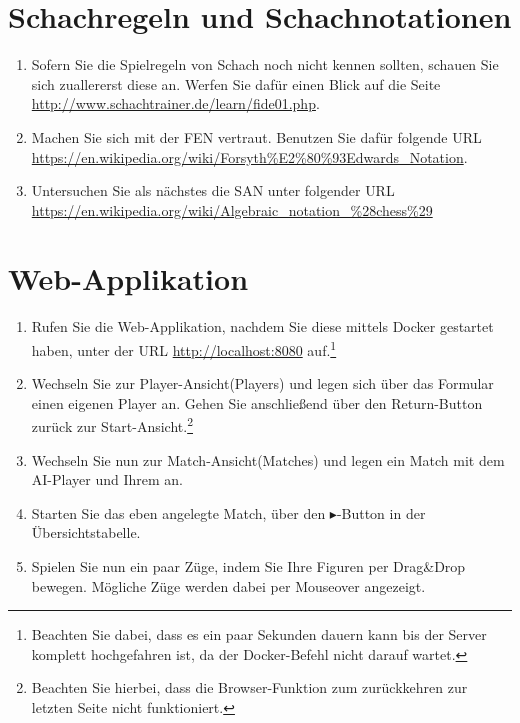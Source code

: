 \section{Schachregeln und Schachnotationen}
\begin{enumerate}
	\item Sofern Sie die Spielregeln von Schach noch nicht kennen sollten, schauen Sie sich zuallererst diese an. Werfen Sie dafür einen Blick auf die Seite \url{http://www.schachtrainer.de/learn/fide01.php}.
	\item Machen Sie sich mit der \acrfull{FEN} vertraut. Benutzen Sie dafür folgende \gls{URL} \url{https://en.wikipedia.org/wiki/Forsyth\%E2\%80\%93Edwards_Notation}.
	\item Untersuchen Sie als nächstes die \acrfull{SAN} unter folgender \gls{URL} \url{https://en.wikipedia.org/wiki/Algebraic_notation_\%28chess\%29}
\end{enumerate}

\section{Web-Applikation}
\begin{enumerate}
	\item Rufen Sie die Web-Applikation, nachdem Sie diese mittels Docker gestartet haben, unter der \gls{URL} \url{http://localhost:8080} auf.\footnote{Beachten Sie dabei, dass es ein paar Sekunden dauern kann bis der Server komplett hochgefahren ist, da der Docker-Befehl nicht darauf wartet.}
	\item Wechseln Sie zur Player-Ansicht(Players) und legen sich über das Formular einen eigenen Player an. Gehen Sie anschließend über den Return-Button zurück zur Start-Ansicht.\footnote{Beachten Sie hierbei, dass die Browser-Funktion zum zurückkehren zur letzten Seite nicht funktioniert.}
	\item Wechseln Sie nun zur Match-Ansicht(Matches) und legen ein Match mit dem AI-Player und Ihrem an.
	\item Starten Sie das eben angelegte Match, über den $\blacktriangleright$-Button in der Übersichtstabelle.
	\item Spielen Sie nun ein paar Züge, indem Sie Ihre Figuren per Drag\&Drop bewegen. Mögliche Züge werden dabei per Mouseover angezeigt.
\end{enumerate}

